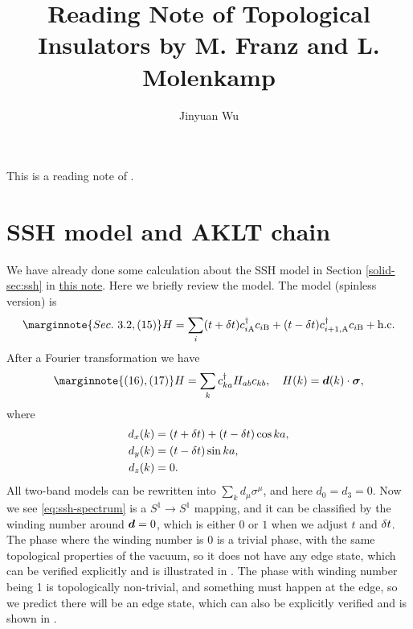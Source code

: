 \documentclass[hyperref, a4paper]{article}
\title{Reading Note of Topological Insulators by M. Franz and L. Molenkamp}
\author{Jinyuan Wu}
\newcommand{\soliddoc}{\href{../solid/solid.pdf}{this note}}
\begin{document}
\maketitle

This is a reading note of \cite{franz2013topological}.

\section{SSH model and AKLT chain}

We have already done some calculation about the SSH model in Section \ref{solid-sec:ssh} in \soliddoc. Here we briefly review 
the model.  The model (spinless version) is 
\begin{equation} \marginnote{Sec.~3.2, (15)}
    H = \sum_i (t + \var{t}) c^\dagger_{i \text{A}} c_{i \text{B}} + (t - \var{t}) c^\dagger_{i+1, \text{A}} c_{i \text{B}} + \text{h.c.}
\end{equation}
After a Fourier transformation we have 
\begin{equation} \marginnote{(16), (17)}
    H = \sum_k c^\dagger_{ka} H_{ab} c_{kb}, \quad H(k) = \vb*{d}(k) \cdot \vb*{\sigma},
\end{equation}
where 
\begin{equation}
    \begin{aligned}
        d_x(k) &= (t + \var{t}) + (t - \var{t}) \cos ka, \\
        d_y(k) &= (t - \var{t}) \sin ka, \\
        d_z(k) &= 0 .
    \end{aligned}
    \label{eq:ssh-spectrum}
\end{equation}
All two-band models can be rewritten into $\sum_k d_\mu \sigma^\mu$, and here $d_0 = d_3 = 0$. 
Now we see \eqref{eq:ssh-spectrum} is a $S^1 \to S^1$ mapping, and it can be classified by the winding number 
around $\vb*{d} = 0$, which is either $0$ or $1$ when we adjust $t$ and $\var{t}$. The phase 
where the winding number is 0 is a trivial phase, with the same topological properties of the vacuum, so 
it does not have any edge state, which can be verified explicitly and is illustrated in .
The phase with winding number being 1 is topologically non-trivial, and something must happen at the edge, 
so we predict there will be an edge state, which can also be explicitly verified and is shown in .
\end{document}
